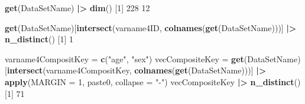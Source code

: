 \documentclass[
]{article}
\newenvironment{Shaded}{\begin{snugshade}}{\end{snugshade}}
\newcommand{\AttributeTok}[1]{\textcolor[rgb]{0.13,0.29,0.53}{#1}}
\newcommand{\DecValTok}[1]{\textcolor[rgb]{0.00,0.00,0.81}{#1}}
\newcommand{\FunctionTok}[1]{\textcolor[rgb]{0.13,0.29,0.53}{\textbf{#1}}}
\newcommand{\NormalTok}[1]{#1}
\newcommand{\OtherTok}[1]{\textcolor[rgb]{0.56,0.35,0.01}{#1}}
\newcommand{\SpecialCharTok}[1]{\textcolor[rgb]{0.81,0.36,0.00}{\textbf{#1}}}
\newcommand{\StringTok}[1]{\textcolor[rgb]{0.31,0.60,0.02}{#1}}
\begin{document}
\begin{Shaded}
\begin{Highlighting}[]
\FunctionTok{get}\NormalTok{(DataSetName) }\SpecialCharTok{|\textgreater{}} \FunctionTok{dim}\NormalTok{()}
\NormalTok{[}\DecValTok{1}\NormalTok{] }\DecValTok{228}  \DecValTok{12}
\end{Highlighting}
\end{Shaded}

\begin{Shaded}
\begin{Highlighting}[]
\FunctionTok{get}\NormalTok{(DataSetName)[}\FunctionTok{intersect}\NormalTok{(varname4ID, }\FunctionTok{colnames}\NormalTok{(}\FunctionTok{get}\NormalTok{(DataSetName)))] }\SpecialCharTok{|\textgreater{}} \FunctionTok{n\_distinct}\NormalTok{()}
\NormalTok{[}\DecValTok{1}\NormalTok{] }\DecValTok{1}
\end{Highlighting}
\end{Shaded}

\begin{Shaded}
\end{Shaded}

\begin{Shaded}
\begin{Highlighting}[]
  
\NormalTok{varname4CompositKey }\OtherTok{=} \FunctionTok{c}\NormalTok{(}\StringTok{"age"}\NormalTok{, }\StringTok{"sex"}\NormalTok{)}
\NormalTok{vecCompositeKey }\OtherTok{=} \FunctionTok{get}\NormalTok{(DataSetName)[}\FunctionTok{intersect}\NormalTok{(varname4CompositKey, }\FunctionTok{colnames}\NormalTok{(}\FunctionTok{get}\NormalTok{(DataSetName)))] }\SpecialCharTok{|\textgreater{}} \FunctionTok{apply}\NormalTok{(}\AttributeTok{MARGIN =} \DecValTok{1}\NormalTok{, paste0, }\AttributeTok{collapse =} \StringTok{"{-}"}\NormalTok{)}
\NormalTok{vecCompositeKey }\SpecialCharTok{|\textgreater{}} \FunctionTok{n\_distinct}\NormalTok{()}
\NormalTok{[}\DecValTok{1}\NormalTok{] }\DecValTok{71}
\end{Highlighting}
\end{Shaded}
\end{document}
